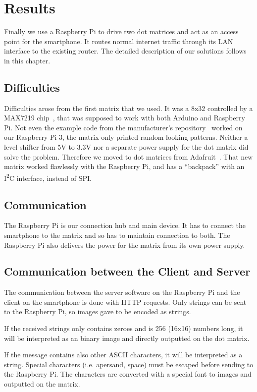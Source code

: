 \documentclass[conference]{IEEEtran}
\begin{document}
\section{Results}
Finally we use a Raspberry Pi to drive two dot matrices and act as an access point for the smartphone. It routes normal internet traffic through its LAN interface to the existing router. The detailed description of our solutions follows in this chapter.

\subsection{Difficulties}
Difficulties arose from the first matrix that we used. It was a 8x32 controlled by a MAX7219 chip~\cite{azdelivery464}, that was supposed to work with both Arduino and Raspberry Pi. Not even the example code from the manufacturer's repository~\cite{azdelivery464} worked on our Raspberry Pi 3, the matrix only printed random looking patterns. Neither a level shifter from 5V to 3.3V nor a separate power supply for the dot matrix did solve the problem. Therefore we moved to dot matrices from Adafruit~\cite{adafruit88}. That new matrix worked flawlessly with the Raspberry Pi, and has a ``backpack'' with an I\textsuperscript{2}C interface, instead of SPI.

\subsection{Communication}
The Raspberry Pi is our connection hub and main device. It has to connect the smartphone to the matrix and so has to maintain connection to both. The Raspberry Pi also delivers the power for the matrix from its own power supply.

\subsection{Communication between the Client and Server}
The communication between the server software on the Raspberry Pi and the client on the smartphone is done with HTTP requests. Only strings can be sent to the Raspberry Pi, so images gave to be encoded as strings.

If the received strings only contains zeroes and is 256 (16x16) numbers long, it will be interpreted as an binary image and directly outputted on the dot matrix.

If the message contains also other ASCII characters, it will be interpreted as a string. Special characters (i.e. apersand, space) must be escaped before sending to the Raspberry Pi. The characters are converted with a special font to images and outputted on the matrix.
\end{document}
